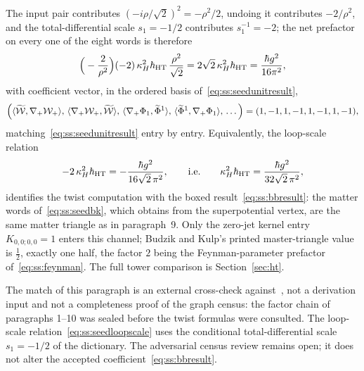 The input pair contributes $(-i\rho/\sqrt2)^{2}=-\rho^{2}/2$, undoing it
contributes $-2/\rho^{2}$, and the total-differential scale $s_1=-1/2$
contributes $s_1^{-1}=-2$; the net prefactor on every one of the eight words
is therefore
\begin{equation}\label{eq:ss:seednetprefactor}
\Big(-\frac{2}{\rho^{2}}\Big)(-2)\,\kappa_H^{2}\hbar_{\mathrm{HT}}\,
\frac{\rho^{2}}{\sqrt2}
=2\sqrt2\,\kappa_H^{2}\hbar_{\mathrm{HT}}
=\frac{\hbar g^{2}}{16\pi^{2}},
\end{equation}
with coefficient vector, in the ordered basis of~\eqref{eq:ss:seedunitresult},
\begin{equation}\label{eq:ss:seedmachinerow}
\Big(
\langle\widetilde{\mathcal{W}},\nabla_{+}\mathcal{W}_{+}\rangle,\,
\langle\nabla_{+}\mathcal{W}_{+},\widetilde{\mathcal{W}}\rangle,\,
\langle\nabla_{+}\Phi_1,\widetilde\Phi^{1}\rangle,\,
\langle\widetilde\Phi^{1},\nabla_{+}\Phi_1\rangle,\,
\dots
\Big)=(1,-1,1,-1,1,-1,1,-1),
\end{equation}
matching~\eqref{eq:ss:seedunitresult} entry by entry. Equivalently, the
loop-scale relation
\begin{equation}\label{eq:ss:seedloopscale}
-2\,\kappa_H^{2}\hbar_{\mathrm{HT}}
=-\frac{\hbar g^{2}}{16\sqrt2\,\pi^{2}},
\qquad\text{i.e.}\qquad
\kappa_H^{2}\hbar_{\mathrm{HT}}
=\frac{\hbar g^{2}}{32\sqrt2\,\pi^{2}},
\end{equation}
identifies the twist computation with the boxed
result~\eqref{eq:ss:bbresult}: the matter words of~\eqref{eq:ss:seedbk},
which \cite{BK} obtains from the superpotential vertex, are the same matter
triangle as in paragraph~9. Only the zero-jet kernel entry
$K_{0,0;0,0}=1$ enters this channel; Budzik and Kulp's printed
master-triangle value is $\tfrac12$, exactly one half, the factor $2$ being
the Feynman-parameter prefactor of~\eqref{eq:ss:feynman}. The full tower
comparison is Section~\ref{sec:ht}.

\begin{remark}\label{rem:ss:seedht}
The match of this paragraph is an external cross-check against~\cite{BK},
not a derivation input and not a completeness proof of the graph census: the
factor chain of paragraphs 1--10 was sealed before the twist formulas were
consulted. The loop-scale relation~\eqref{eq:ss:seedloopscale} uses the
conditional total-differential scale $s_1=-1/2$ of the dictionary. The
adversarial census review remains open; it does not alter the accepted
coefficient~\eqref{eq:ss:bbresult}.
\end{remark}

